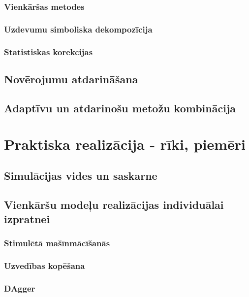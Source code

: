 \documentclass[12pt, a4paper]{article}
\numberwithin{equation}{section} %
\begin{document}
\subsubsection{Vienkāršas metodes}

\subsubsection{Uzdevumu simboliska dekompozīcija}

\subsubsection{Statistiskas korekcijas}

\subsection{Novērojumu atdarināšana}

\subsection{Adaptīvu un atdarinošu metožu kombinācija}


\newpage
\section{Praktiska realizācija - rīki, piemēri}

\subsection{Simulācijas vides un saskarne}

\subsection{Vienkāršu modeļu realizācijas individuālai izpratnei}

\subsubsection{Stimulētā mašīnmācīšanās}

\subsubsection{Uzvedības kopēšana}

\subsubsection{DAgger}
\end{document}
